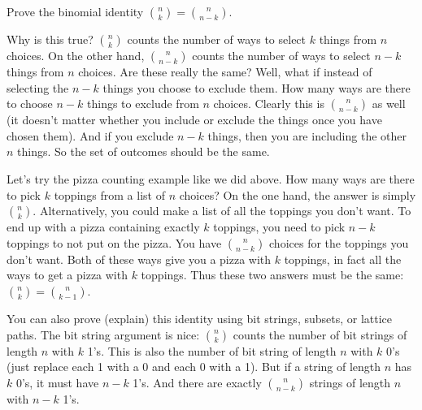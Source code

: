 \documentclass[12pt]{article}
\begin{document}
\begin{example}
  Prove the binomial identity ${n \choose k} = {n \choose n-k}$.
  \begin{solution}
    Why is this true?  ${n \choose k}$ counts the number of ways to select $k$ things from $n$ choices.  On the other hand, ${n \choose n-k}$ counts the number of ways to select $n-k$ things from $n$ choices.  Are these really the same?  Well, what if instead of selecting the $n-k$ things you choose to exclude them.  How many ways are there to choose $n-k$ things to exclude from $n$ choices.  Clearly this is ${n \choose n-k}$ as well (it doesn't matter whether you include or exclude the things once you have chosen them).  And if you exclude $n-k$ things, then you are including the other $n$ things.  So the set of outcomes should be the same.
    
    Let's try the pizza counting example like we did above.  How many ways are there to pick $k$ toppings from a list of $n$ choices?  On the one hand, the answer is simply ${n \choose k}$.  Alternatively, you could make a list of all the toppings you don't want.  To end up with a pizza containing exactly $k$ toppings, you need to pick $n-k$ toppings to not put on the pizza.  You have ${n \choose n-k}$ choices for the toppings you don't want. Both of these ways give you a pizza with $k$ toppings, in fact all the ways to get a pizza with $k$ toppings.  Thus  these two answers must be the same: ${n \choose k} = {n \choose k-1}$.
    
    You can also prove (explain) this identity using bit strings, subsets, or lattice paths.  The bit string argument is nice: ${n \choose k}$ counts the number of bit strings of length $n$ with $k$ 1's.  This is also the number of bit string of length $n$ with $k$ 0's (just replace each 1 with a 0 and each 0 with a 1).  But if a string of length $n$ has $k$ 0's, it must have $n-k$ 1's.  And there are exactly ${n\choose n-k}$ strings of length $n$ with $n-k$ 1's.
  \end{solution}
\end{example}
\end{document}
